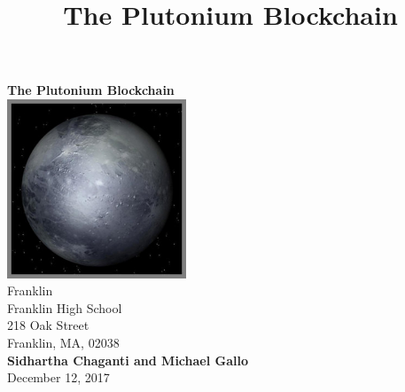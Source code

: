 \documentclass[12pt]{article}
\title{The Plutonium Blockchain}
\begin{document}
\begin{titlepage}
	\begin{center}
		\vspace{1cm}
		\Huge
		\textbf{The Plutonium Blockchain\\}
		\vspace{1.5cm}
		\includegraphics[width=0.4\textwidth]{pluto}\\
		\vspace{1.5cm}
		\large
		Franklin\\
		Franklin High School\\
		218 Oak Street\\
		Franklin, MA, 02038\\
		\vspace{1.5cm}
		\textbf{Sidhartha Chaganti and Michael Gallo}\\
		December 12, 2017
	\end{center}
\end{titlepage}
\newpage
\tableofcontents
\newpage
{}
\end{document}

